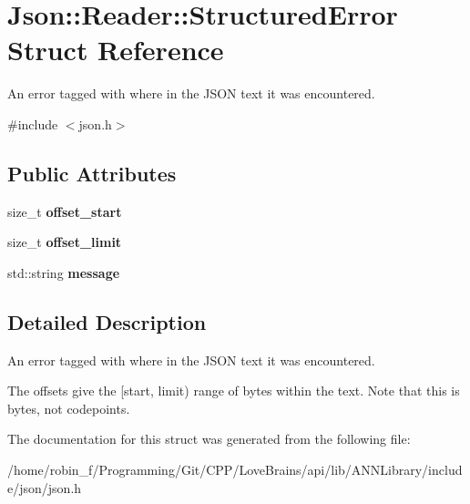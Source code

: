 \hypertarget{struct_json_1_1_reader_1_1_structured_error}{}\section{Json\+:\+:Reader\+:\+:Structured\+Error Struct Reference}
\label{struct_json_1_1_reader_1_1_structured_error}


An error tagged with where in the J\+S\+O\+N text it was encountered.  




{\ttfamily \#include $<$json.\+h$>$}

\subsection*{Public Attributes}
\begin{DoxyCompactItemize}
\item 
\hypertarget{struct_json_1_1_reader_1_1_structured_error_a160dae4eb3464a2209b743c755baf65f}{}size\+\_\+t {\bfseries offset\+\_\+start}\label{struct_json_1_1_reader_1_1_structured_error_a160dae4eb3464a2209b743c755baf65f}

\item 
\hypertarget{struct_json_1_1_reader_1_1_structured_error_a80747dae744bcc80a9bc81c94fd42e13}{}size\+\_\+t {\bfseries offset\+\_\+limit}\label{struct_json_1_1_reader_1_1_structured_error_a80747dae744bcc80a9bc81c94fd42e13}

\item 
\hypertarget{struct_json_1_1_reader_1_1_structured_error_ab8755e5201b78c6ae077338f8819e6e6}{}std\+::string {\bfseries message}\label{struct_json_1_1_reader_1_1_structured_error_ab8755e5201b78c6ae077338f8819e6e6}

\end{DoxyCompactItemize}


\subsection{Detailed Description}
An error tagged with where in the J\+S\+O\+N text it was encountered. 

The offsets give the \mbox{[}start, limit) range of bytes within the text. Note that this is bytes, not codepoints. 

The documentation for this struct was generated from the following file\+:\begin{DoxyCompactItemize}
\item 
/home/robin\+\_\+f/\+Programming/\+Git/\+C\+P\+P/\+Love\+Brains/api/lib/\+A\+N\+N\+Library/include/json/json.\+h\end{DoxyCompactItemize}
